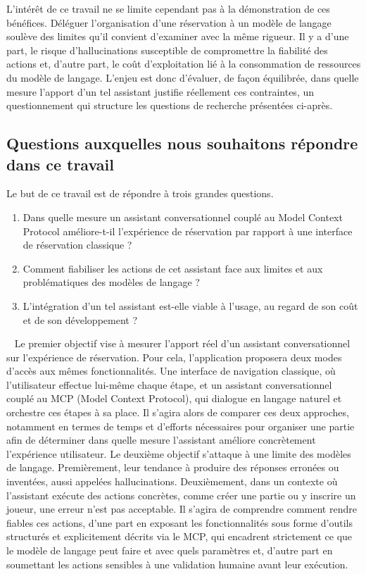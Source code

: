 \documentclass[12pt]{article}
\begin{document}
\newline\newline
L'intérêt de ce travail ne se limite cependant pas à la démonstration de ces bénéfices. Déléguer l'organisation d'une réservation à un modèle de langage soulève des limites qu'il convient d'examiner avec la même rigueur. Il y a d'une part, le risque d'hallucinations susceptible de compromettre la fiabilité des actions et, d'autre part, le coût d'exploitation lié à la consommation de ressources du modèle de langage. L'enjeu est donc d'évaluer, de façon équilibrée, dans quelle mesure l'apport d'un tel assistant justifie réellement ces contraintes, un questionnement qui structure les questions de recherche présentées ci-après.
\subsection{Questions auxquelles nous souhaitons répondre dans ce travail}
Le but de ce travail est de répondre à trois grandes questions. 
\newline
\begin{enumerate}
    \item Dans quelle mesure un assistant conversationnel couplé au Model Context Protocol améliore-t-il l'expérience de réservation par rapport à une interface de réservation classique ?
    \item Comment fiabiliser les actions de cet assistant face aux limites et aux problématiques des modèles de langage ?
    \item L'intégration d'un tel assistant est-elle viable à l'usage, au regard de son coût et de son développement ?
\end{enumerate}\
\newline
Le premier objectif vise à mesurer l'apport réel d'un assistant conversationnel sur l'expérience de réservation. Pour cela, l'application proposera deux modes d'accès aux mêmes fonctionnalités. Une interface de navigation classique, où l'utilisateur effectue lui-même chaque étape, et un assistant conversationnel couplé au MCP (Model Context Protocol), qui dialogue en langage naturel et orchestre ces étapes à sa place. Il s'agira alors de comparer ces deux approches, notamment en termes de temps et d'efforts nécessaires pour organiser une partie afin de déterminer dans quelle mesure l'assistant améliore concrètement l'expérience utilisateur.
\newline\newline
Le deuxième objectif s'attaque à une limite des modèles de langage. Premièrement, leur tendance à produire des réponses erronées ou inventées, aussi appelées hallucinations. Deuxièmement, dans un contexte où l'assistant exécute des actions concrètes, comme créer une partie ou y inscrire un joueur, une erreur n'est pas acceptable. Il s'agira de comprendre comment rendre fiables ces actions, d'une part en exposant les fonctionnalités sous forme d'outils structurés et explicitement décrits via le MCP, qui encadrent strictement ce que le modèle de langage peut faire et avec quels paramètres et, d'autre part en soumettant les actions sensibles à une validation humaine avant leur exécution.
\end{document}
